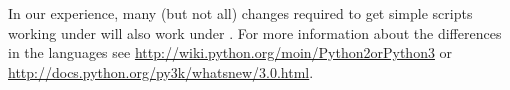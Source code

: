 In our experience, many (but not all) changes required to get simple scripts working under \pythonthree will also
work under \pythontwo.
For more information about the differences in the languages see \url{http://wiki.python.org/moin/Python2orPython3} 
or \url{http://docs.python.org/py3k/whatsnew/3.0.html}.
